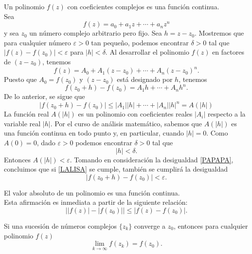 \begin{lemma}
    Un polinomio $f(z)$ con coeficientes complejos es una función continua. \\
    \demostracion Sea
    $$f(z)=a_0+a_1z+ \cdots + a_nz^n$$
    y sea $z_0$ un número complejo arbitrario pero fijo. Sea $h=z-z_0$. Mostremos que para cualquier número $\varepsilon >0$ tan pequeño, podemos encontrar $\delta >0$ tal que $|f(z)-f(z_0)|<\varepsilon$ para $|h|<\delta$. Al desarrollar el polinomio $f(z)$ en factores de $(z-z_0)$, tenemos
    $$f(z)=A_0+A_1(z-z_0)+\cdots + A_n(z-z_0)^n.$$
    Puesto que $A_0=f(z_0)$ y $(z-z_0)$ está designado por $h$, tenemos
    $$f(z_0+h)-f(z_0)=A_1h+\cdots +A_nh^n.$$
    De lo anterior, se sigue que
    \begin{equation}
        |f(z_0+h)-f(z_0)| \leq |A_1||h|+ \cdots +|A_n||h|^n=A(|h|) \label{PAPAPA}
    \end{equation}
    La función real $A(|h|)$ es un polinomio con coeficientes reales $|A_i|$ respecto a la variable real $|h|$. Por el curso de análisis matemático, sabemos que $A(|h|)$ es una función continua en todo punto y, en particular, cuando $|h|=0$. Como $A(0)=0$, dado $\varepsilon >0$ podemos encontrar $\delta >0$ tal que
    \begin{equation}
        |h|<\delta. \label{LALISA}
    \end{equation}
    Entonces $A(|h|)<\varepsilon$. Tomando en consideración la desigualdad \eqref{PAPAPA}, concluimos que si \eqref{LALISA} se cumple, también se cumplirá la desigualdad
    $$|f(z_0+h)-f(z_0)|<\varepsilon.$$
\end{lemma}

\begin{corollary}\label{COROLARIOIMPORTANTE}
    El valor absoluto de un polinomio es una función continua. \\
    \demostracion Esta afirmación es inmediata a partir de la siguiente relación:
    $$\big| |f(z)|-|f(z_0)| \big| \leq |f(z)-f(z_0)|.$$
\end{corollary}

\begin{corollary}
    Si una sucesión de números complejos $\{z_k\}$ converge a $z_0$, entonces para cualquier polinomio $f(z)$
    $$\lim_{k \rightarrow \infty} f(z_k)=f(z_0).$$
\end{corollary}


